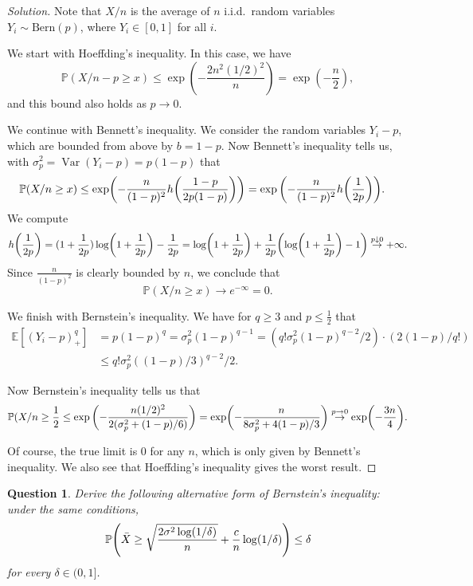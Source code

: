 \documentclass{article}
\theoremstyle{plain}
\newtheorem{question}{Question}
\theoremstyle{remark}
\newenvironment{solution}{\begin{proof}[Solution]\renewcommand\qedsymbol{}}{\end{proof}}
\newcommand{\Bb}{\mathbb}
\newcommand{\Rm}{\mathrm}
\newcommand{\PP}{\Bb P}
\newcommand{\EE}{\Bb E}
\DeclareMathOperator{\Var}{Var}
\begin{document}
\begin{solution}
	Note that $X/n$ is the average of $n$ i.i.d.\ random variables $Y_i \sim \Rm{Bern}(p)$, where $Y_i \in [0, 1]$ for all $i$.  
	
	We start with Hoeffding's inequality. In this case, we have
	\[
	\PP(X/n - p \geq x) \leq \exp(-\frac{2n^2(1/2)^2}{n}) = \exp(- \frac n2),
	\]
	and this bound also holds as $p \to 0$. 
	
	We continue with Bennett's inequality. We consider the random variables $Y_i - p$, which are bounded from above by $b = 1 - p$. Now Bennett's inequality tells us, with $\sigma_p^2 = \Var(Y_i - p) = p(1-p)$ that
	\begin{align*}
		\PP(X/n \geq x) &\leq \exp(- \frac{n}{(1-p)^2} h\qty(\frac{1-p}{2p(1-p)})) = \exp\qty(- \frac{n}{(1-p)^2} h\qty(\frac{1}{2p})).
	\end{align*}
We compute
\[
h\qty(\frac1{2p}) = (1 + \frac1{2p}) \log(1 + \frac1{2p}) - \frac1{2p} = \log(1 + \frac1{2p}) + \frac1{2p} \qty(\log(1 + \frac1{2p}) - 1) \overset{p \downarrow 0}\to +\infty. 
\]
Since $\frac{n}{(1-p)^2}$ is clearly bounded by $n$, we conclude that 
\[
\PP(X/n \geq x) \to e^{-\infty} = 0. 
\]
	

We finish with Bernstein's inequality.  We have for $q \geq 3$ and $p \leq\frac12$ that 
\begin{align*}
	\EE[(Y_i - p)_+^q] &= p(1-p)^q = \sigma_p^2 (1-p)^{q-1} = (q! \sigma_p^2 (1-p)^{q-2}/2)\cdot (2(1-p)/q!) \\
	&\leq q!\sigma_p^2 ((1-p)/3)^{q-2}/2.
\end{align*}

Now Bernstein's inequality tells us that
\[
\PP(X/n \geq \frac12 \leq \exp\qty(- \frac{n(1/2)^2}{2(\sigma_p^2 + (1-p)/6)}) = \exp(- \frac{n}{8\sigma_p^2 + 4(1-p)/3}) \overset{p \to 0}{\to} \exp(-\frac{3n}{4}). \]

Of course, the true limit is 0 for any $n$, which is only given by Bennett's inequality. We also see that Hoeffding's inequality gives the worst result. 
\end{solution}

\begin{question}
	Derive the following alternative form of Bernstein's inequality: under the same conditions, 
	\[
	\PP\qty(\bar X \geq \sqrt{\frac{2\sigma^2 \log(1/\delta)}{n}} + \frac cn \log(1/\delta)) \leq \delta
	\]
	for every $\delta \in (0, 1]$. 
\end{question}
\end{document}
